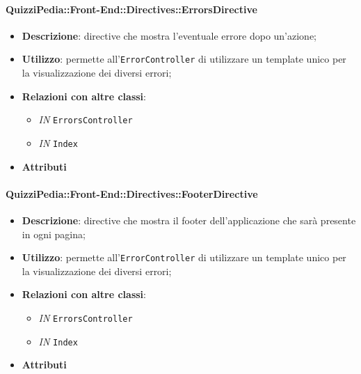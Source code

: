 \paragraph{QuizziPedia::Front-End::Directives::ErrorsDirective}
\begin{itemize}
	\item \textbf{Descrizione}: directive che mostra l'eventuale errore dopo un'azione;
	\item \textbf{Utilizzo}: permette all'\texttt{ErrorController} di utilizzare un template unico per la visualizzazione dei diversi errori;
	\item \textbf{Relazioni con altre classi}:
	\begin{itemize}
		\item \textit{IN} \texttt{ErrorsController}
		\item \textit{IN} \texttt{Index}
	\end{itemize}
	\item \textbf{Attributi}
\end{itemize}

\paragraph{QuizziPedia::Front-End::Directives::FooterDirective}
\begin{itemize}
	\item \textbf{Descrizione}: directive che mostra il footer dell'applicazione che sarà presente in ogni pagina;
	\item \textbf{Utilizzo}: permette all'\texttt{ErrorController} di utilizzare un template unico per la visualizzazione dei diversi errori;
	\item \textbf{Relazioni con altre classi}:
	\begin{itemize}
		\item \textit{IN} \texttt{ErrorsController}
		\item \textit{IN} \texttt{Index}
	\end{itemize}
	\item \textbf{Attributi}
\end{itemize}

